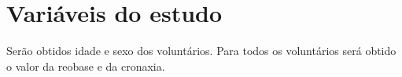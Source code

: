 \section{Variáveis do estudo}
Serão obtidos idade e sexo dos voluntários. Para todos os voluntários será obtido o valor da reobase e da cronaxia.